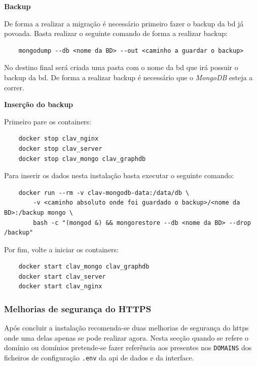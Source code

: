 \begin{description}
    \item \textbf{Backup}

    De forma a realizar a migração é necessário primeiro fazer o backup da \acrshort{bd} já povoada. Basta realizar o seguinte comando de forma a realizar backup:
    \footnotesize
    \begin{verbatim}
    mongodump --db <nome da BD> --out <caminho a guardar o backup>
    \end{verbatim}
    \normalsize
    \vspace{-0.5cm}
    No destino final será criada uma pasta com o nome da \acrshort{bd} que irá possuir o backup da \acrshort{bd}.
    De forma a realizar backup é necessário que o \textit{MongoDB} esteja a correr.
    \item \textbf{Inserção do backup}

    Primeiro pare os containers:
    \footnotesize
    \begin{verbatim}
    docker stop clav_nginx
    docker stop clav_server
    docker stop clav_mongo clav_graphdb
    \end{verbatim}
    \normalsize
    \vspace{-0.3cm}
    Para inserir os dados nesta instalação basta executar o seguinte comando:
    \footnotesize
    \begin{verbatim}
    docker run --rm -v clav-mongodb-data:/data/db \
        -v <caminho absoluto onde foi guardado o backup>/<nome da BD>:/backup mongo \
        bash -c "(mongod &) && mongorestore --db <nome da BD> --drop /backup"
    \end{verbatim}
    \normalsize
    \vspace{-0.3cm}
    Por fim, volte a iniciar os containers:
    \footnotesize
    \begin{verbatim}
    docker start clav_mongo clav_graphdb
    docker start clav_server
    docker start clav_nginx
    \end{verbatim}
    \normalsize
    \vspace{-0.5cm}
\end{description}

\subsubsection{Melhorias de segurança do HTTPS}\label{sec:inst-melhorias}
Após concluir a instalação recomenda-se duas melhorias de segurança do \acrshort{https} onde uma delas apenas se pode realizar agora. Nesta secção quando se refere o domínio ou domínios pretende-se fazer referência aos presentes nos \texttt{DOMAINS} dos ficheiros de configuração \texttt{.env} da \acrshort{api} de dados e da interface.

